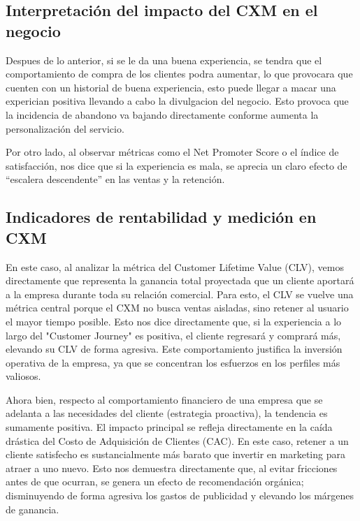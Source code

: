 \documentclass[letterpaper,11pt]{article}
\begin{document}
\subsection{Interpretación del impacto del CXM en el negocio}

Despues de lo anterior, si se le da una buena experiencia, se tendra que el 
comportamiento de compra de los clientes podra aumentar, lo que provocara 
que cuenten con un historial de buena experiencia, esto puede llegar a macar una experician 
positiva llevando a cabo la divulgacion del negocio. 
Esto provoca que la incidencia de abandono va bajando directamente conforme aumenta la personalización del servicio.

Por otro lado, 
al observar métricas como el Net Promoter Score 
o el índice de satisfacción, nos dice que si 
la experiencia es mala, se aprecia un claro efecto de 
``escalera descendente'' en las ventas y la retención. 

\subsection{Indicadores de rentabilidad y medición en CXM}

En este caso, al analizar la métrica del Customer Lifetime Value (CLV), vemos directamente que representa la ganancia total proyectada que un cliente aportará a la empresa durante toda su relación comercial. Para esto, el CLV se vuelve una métrica central porque el CXM no busca ventas aisladas, sino retener al usuario el mayor tiempo posible. Esto nos dice directamente que, si la experiencia a lo largo del "Customer Journey" es positiva, el cliente regresará y comprará más, elevando su CLV de forma agresiva. Este comportamiento justifica la inversión operativa de la empresa, ya que se concentran los esfuerzos en los perfiles más valiosos.


Ahora bien, respecto al comportamiento financiero de una empresa que se adelanta a las necesidades del cliente (estrategia proactiva), la tendencia es sumamente positiva. El impacto principal se refleja directamente en la caída drástica del Costo de Adquisición de Clientes (CAC). En este caso, retener a un cliente satisfecho es sustancialmente más barato que invertir en marketing para atraer a uno nuevo. Esto nos demuestra directamente que, al evitar fricciones antes de que ocurran, se genera un efecto de recomendación orgánica; disminuyendo de forma agresiva los gastos de publicidad y elevando los márgenes de ganancia.
\end{document}

